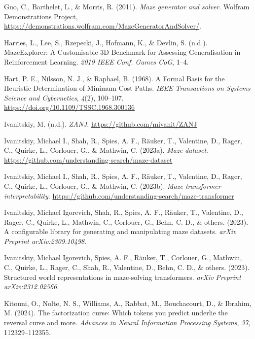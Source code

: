 \documentclass[10pt,a4paper,onecolumn]{article}
\newlength{\cslhangindent}
\newenvironment{CSLReferences}[2] %
 {\begin{list}{}{%
  \setlength{\itemindent}{0pt}
  \setlength{\leftmargin}{0pt}
  \setlength{\parsep}{0pt}
  \ifodd #1
   \setlength{\leftmargin}{\cslhangindent}
   \setlength{\itemindent}{-1\cslhangindent}
  \fi
  \setlength{\itemsep}{#2\baselineskip}}}
 {\end{list}}
\begin{document}
\begin{CSLReferences}{1}{0.5}
\leavevmode{}%
Guo, C., Barthelet, L., \& Morris, R. (2011). \emph{Maze generator and
solver}. Wolfram Demonstrations Project,
\url{https://demonstrations.wolfram.com/MazeGeneratorAndSolver/}.

\leavevmode{}%
Harries, L., Lee, S., Rzepecki, J., Hofmann, K., \& Devlin, S. (n.d.).
{MazeExplorer}: {A Customisable 3D Benchmark} for {Assessing
Generalisation} in {Reinforcement Learning}. \emph{2019 {IEEE Conf}.
{Games CoG}}, 1--4.

\leavevmode{}%
Hart, P. E., Nilsson, N. J., \& Raphael, B. (1968). A {Formal Basis} for
the {Heuristic Determination} of {Minimum Cost Paths}. \emph{IEEE
Transactions on Systems Science and Cybernetics}, \emph{4}(2), 100--107.
\url{https://doi.org/10.1109/TSSC.1968.300136}

\leavevmode{}%
Ivanitskiy, M. (n.d.). \emph{ZANJ}.
\url{https://github.com/mivanit/ZANJ}

\leavevmode{}%
Ivanitskiy, Michael I., Shah, R., Spies, A. F., Räuker, T., Valentine,
D., Rager, C., Quirke, L., Corlouer, G., \& Mathwin, C. (2023a).
\emph{Maze dataset}.
\url{https://github.com/understanding-search/maze-dataset}

\leavevmode{}%
Ivanitskiy, Michael I., Shah, R., Spies, A. F., Räuker, T., Valentine,
D., Rager, C., Quirke, L., Corlouer, G., \& Mathwin, C. (2023b).
\emph{Maze transformer interpretability}.
\url{https://github.com/understanding-search/maze-transformer}

\leavevmode{}%
Ivanitskiy, Michael Igorevich, Shah, R., Spies, A. F., Räuker, T.,
Valentine, D., Rager, C., Quirke, L., Mathwin, C., Corlouer, G., Behn,
C. D., \& others. (2023). A configurable library for generating and
manipulating maze datasets. \emph{arXiv Preprint arXiv:2309.10498}.

\leavevmode{}%
Ivanitskiy, Michael Igorevich, Spies, A. F., Räuker, T., Corlouer, G.,
Mathwin, C., Quirke, L., Rager, C., Shah, R., Valentine, D., Behn, C.
D., \& others. (2023). Structured world representations in maze-solving
transformers. \emph{arXiv Preprint arXiv:2312.02566}.

\leavevmode{}%
Kitouni, O., Nolte, N. S., Williams, A., Rabbat, M., Bouchacourt, D., \&
Ibrahim, M. (2024). The factorization curse: Which tokens you predict
underlie the reversal curse and more. \emph{Advances in Neural
Information Processing Systems}, \emph{37}, 112329--112355.


\end{CSLReferences}
\end{document}
